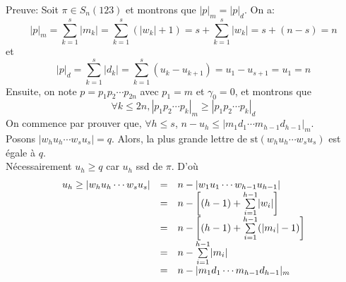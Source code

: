 Preuve: Soit $\pi \in S_{n}(123)$ et montrons que $|p|_{m} = |p|_{d}$. On a:
$$
	|p|_{m} = \underset{k=1}{\overset{s}{\sum}}|m_{k}| = \underset{k=1}{\overset{s}{\sum}}(|w_{k}|+1)=s+\underset{k=1}{\overset{s}{\sum}}|w_{k}| = s+(n-s)=n
$$
et
$$
	|p|_{d} = \underset{k=1}{\overset{s}{\sum}}|d_{k}| = \underset{k=1}{\overset{s}{\sum}}(u_{k}-u_{k+1}) = u_{1} - u_{s+1}=u_{1}=n
$$
Ensuite, on note $p=p_{1}p_{2}\cdots p_{2n}$ avec $p_{1}=m$ et  $\gamma_{0}=0$, et montrons que $$\forall k\leq 2n, |p_{1}p_{2}\cdots p_{k}|_{m}\geq |p_{1}p_{2}\cdots p_{k}|_{d}$$
On commence par prouver que, $\forall h\leq s$, $n-u_{h}\leq |m_{1}d_{1}\cdots m_{h-1}d_{h-1} |_{m}$.\\
Posons $| w_{h}u_{h}\cdots w_{s}u_{s} |=q$. Alors, la plus grande lettre de $\text{st}(w_{h}u_{h}\cdots w_{s}u_{s})$  est égale à $q$.\\ Nécessairement $u_{h}\geq q$ car $u_{h}$ ssd de $\pi$. D'où
\[\begin{array}{l l l}
		u_{h}\geq | w_{h}u_{h}\cdots w_{s}u_{s} | & = & n-| w_{1}u_{1}\cdots w_{h-1}u_{h-1} |                                 \\
		                                          & = & n-\left[ (h-1)+ \underset{i=1}{\overset{h-1}{\sum}}|w_{i}|\right]     \\
		                                          & = & n-\left[ (h-1)+ \underset{i=1}{\overset{h-1}{\sum}}(|m_{i}|-1)\right] \\
		                                          & = & n- \underset{i=1}{\overset{h-1}{\sum}}|m_{i}|                         \\
		                                          & = & n - | m_{1}d_{1}\cdots m_{h-1}d_{h-1} |_{m}
	\end{array}
\]
